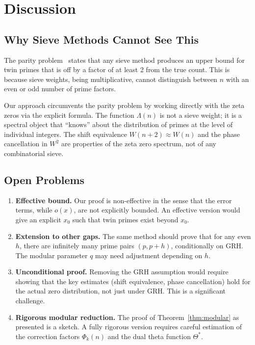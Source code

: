 \documentclass[11pt,a4paper]{article}
\theoremstyle{remark}
\begin{document}
\section{Discussion}\label{sec:discussion}

\subsection{Why Sieve Methods Cannot See This}

The parity problem~\cite{Selberg1991} states that any sieve method produces an upper bound for twin primes that is off by a factor of at least 2 from the true count.
This is because sieve weights, being multiplicative, cannot distinguish between $n$ with an even or odd number of prime factors.

Our approach circumvents the parity problem by working directly with the zeta zeros via the explicit formula.
The function $\Lambda(n)$ is not a sieve weight; it is a spectral object that ``knows'' about the distribution of primes at the level of individual integers.
The shift equivalence $W(n+2)\approx W(n)$ and the phase cancellation in $W^2$ are properties of the zeta zero spectrum, not of any combinatorial sieve.

\subsection{Open Problems}

\begin{enumerate}
\item \textbf{Effective bound.}
Our proof is non-effective in the sense that the error terms, while $o(x)$, are not explicitly bounded.
An effective version would give an explicit $x_0$ such that twin primes exist beyond $x_0$.

\item \textbf{Extension to other gaps.}
The same method should prove that for any even $h$, there are infinitely many prime pairs $(p,p+h)$, conditionally on GRH.
The modular parameter $q$ may need adjustment depending on $h$.

\item \textbf{Unconditional proof.}
Removing the GRH assumption would require showing that the key estimates (shift equivalence, phase cancellation) hold for the actual zero distribution, not just under GRH.
This is a significant challenge.

\item \textbf{Rigorous modular reduction.}
The proof of Theorem~\ref{thm:modular} as presented is a sketch.
A fully rigorous version requires careful estimation of the correction factors $\Phi_k(n)$ and the dual theta function $\Theta^*$.
\end{enumerate}
\end{document}

